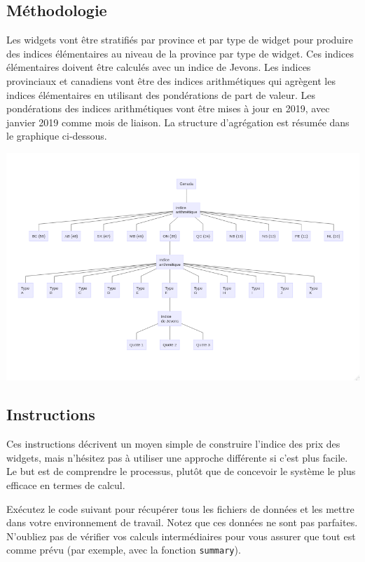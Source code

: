 \documentclass[
]{article}
\begin{document}
\hypertarget{muxe9thodologie}{%
\subsection{Méthodologie}\label{muxe9thodologie}}

Les widgets vont être stratifiés par province et par type de widget pour produire des indices élémentaires au niveau de la province par type de widget. Ces indices élémentaires doivent être calculés avec un indice de Jevons. Les indices provinciaux et canadiens vont être des indices arithmétiques qui agrègent les indices élémentaires en utilisant des pondérations de part de valeur. Les pondérations des indices arithmétiques vont être mises à jour en 2019, avec janvier 2019 comme mois de liaison. La structure d'agrégation est résumée dans le graphique ci-dessous.

\includegraphics{img/structure.png}

\hypertarget{instructions}{%
\subsection{Instructions}\label{instructions}}

Ces instructions décrivent un moyen simple de construire l'indice des prix des widgets, mais n'hésitez pas à utiliser une approche différente si c'est plus facile. Le but est de comprendre le processus, plutôt que de concevoir le système le plus efficace en termes de calcul.

Exécutez le code suivant pour récupérer tous les fichiers de données et les mettre dans votre environnement de travail. Notez que ces données ne sont pas parfaites. N'oubliez pas de vérifier vos calculs intermédiaires pour vous assurer que tout est comme prévu (par exemple, avec la fonction \texttt{summary}).
\end{document}
